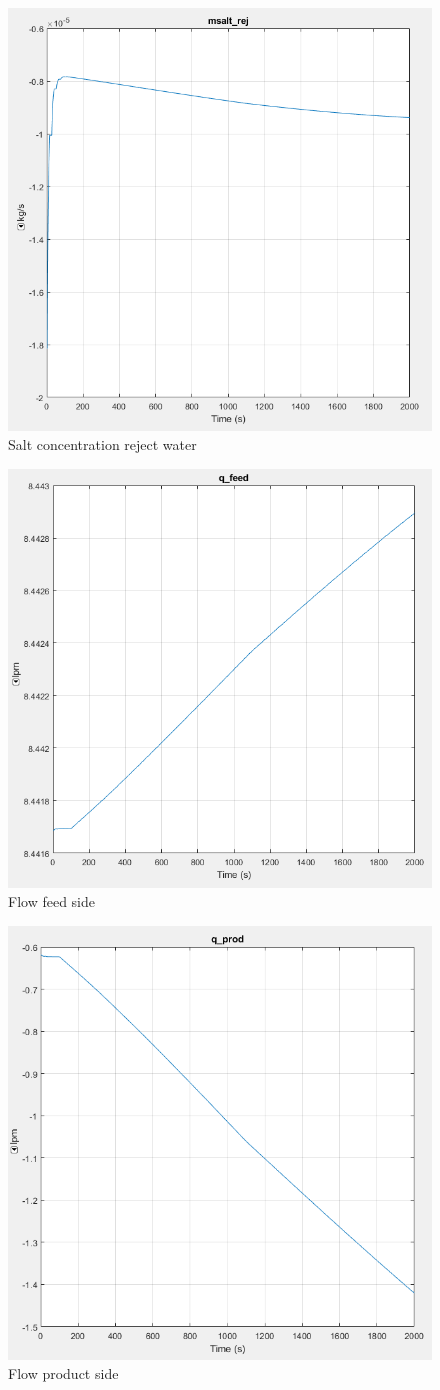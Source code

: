 \begin{figure}[h]
  \centering
  \includegraphics[width=0.5\linewidth]{msalt_rej.PNG}
  \caption{Salt concentration reject water}
  \label{fig:msaltr}
\end{figure}

\begin{figure}[h]
  \centering
  \includegraphics[width=0.5\linewidth]{q_feed.PNG}
  \caption{Flow feed side}
  \label{fig:qf}
\end{figure}

\begin{figure}[h]
  \centering
  \includegraphics[width=0.5\linewidth]{q_prod.PNG}
  \caption{Flow product side}
  \label{fig:qp}
\end{figure}

